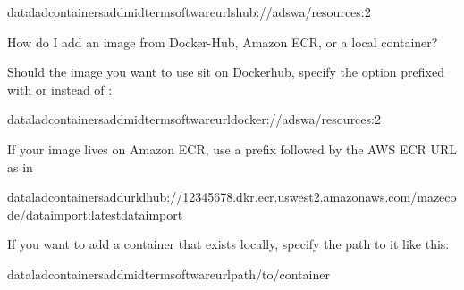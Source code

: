 \begin{sphinxVerbatim}[commandchars=\\\{\}]
dataladcontainers\PYGZhy{}addmidterm\PYGZhy{}software\PYGZhy{}\PYGZhy{}urlshub://adswa/resources:2
\end{sphinxVerbatim}

\ignorespaces \begin{findoutmore}[label={fom-container-add}, before title={\thetcbcounter\ }, float, floatplacement=tb, check odd page=true]{How do I add an image from Docker-Hub, Amazon ECR, or a local container?}
\label{\detokenize{basics/101-133-containersrun:fom-container-add}}

\sphinxAtStartPar
Should the image you want to use sit on Dockerhub, specify the 
option prefixed with  or  instead of :

\begin{sphinxVerbatim}[commandchars=\\\{\}]
dataladcontainers\PYGZhy{}addmidterm\PYGZhy{}software\PYGZhy{}\PYGZhy{}urldocker://adswa/resources:2
\end{sphinxVerbatim}

\sphinxAtStartPar
If your image lives on Amazon ECR, use a  prefix followed by the AWS ECR URL as in

\begin{sphinxVerbatim}[commandchars=\\\{\}]
dataladcontainers\PYGZhy{}add\PYGZhy{}\PYGZhy{}urldhub://12345678.dkr.ecr.us\PYGZhy{}west\PYGZhy{}2.amazonaws.com/maze\PYGZhy{}code/data\PYGZhy{}import:latestdata\PYGZhy{}import
\end{sphinxVerbatim}

\sphinxAtStartPar
If you want to add a container that exists locally, specify the path to it
like this:

\begin{sphinxVerbatim}[commandchars=\\\{\}]
dataladcontainers\PYGZhy{}addmidterm\PYGZhy{}software\PYGZhy{}\PYGZhy{}urlpath/to/container
\end{sphinxVerbatim}


\end{findoutmore}

